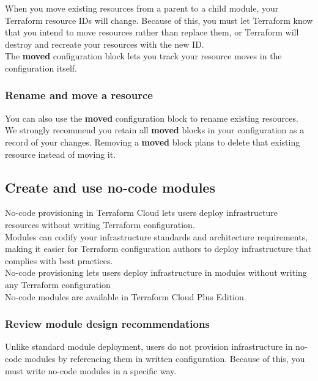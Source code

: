 \documentclass[12pt, letterpaper, twoside]{article}
\begin{document}
When you move existing resources from a parent to a child module, your Terraform resource 
IDs will change. Because of this, you must let Terraform know that you intend to move 
resources rather than replace them, or Terraform will destroy and recreate your resources 
with the new ID.\\

The \textbf{moved} configuration block lets you track your resource moves in the configuration 
itself.\\

\subsubsection{Rename and move a resource}
You can also use the \textbf{moved} configuration block to rename existing resources.\\

We strongly recommend you retain all \textbf{moved} blocks in your configuration as a record of your 
changes. Removing a \textbf{moved} block plans to delete that existing resource instead of moving it.\\

\subsection{Create and use no-code modules}
No-code provisioning in Terraform Cloud lets users deploy infrastructure resources without writing 
Terraform configuration.\\
Modules can codify your infrastructure standards and architecture requirements, making it easier for 
Terraform configuration authors to deploy infrastructure that complies with best practices.\\
No-code provisioning lets users deploy infrastructure in modules without writing any Terraform configuration\\

No-code modules are available in Terraform Cloud Plus Edition.

\subsubsection{Review module design recommendations}
Unlike standard module deployment, users do not provision infrastructure in no-code modules by 
referencing them in written configuration. Because of this, you must write no-code modules in 
a specific way.\\
\end{document}
